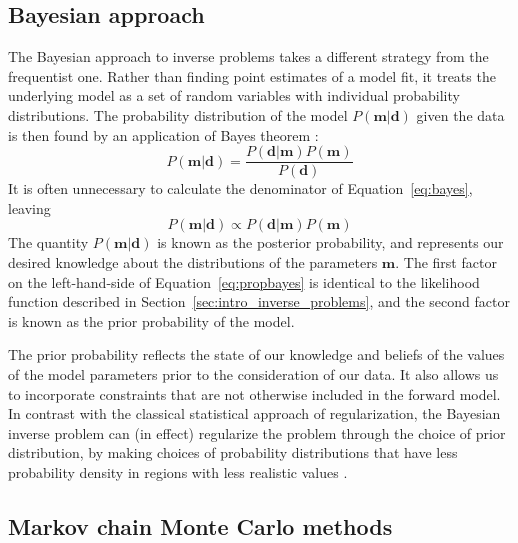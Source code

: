 \documentclass[preprint,12pt,authoryear]{elsarticle}
\begin{document}
\subsection{Bayesian approach}

The Bayesian approach to inverse problems takes a different strategy from the frequentist one.
Rather than finding point estimates of a model fit, it treats the underlying model
as a set of random variables with individual probability distributions.
The probability distribution of the model $P(\mathbf{m} \vert \mathbf{d})$ given the data 
is then found by an application of Bayes theorem \citep[cf.][]{sivia2006data}:
\begin{equation}
P\left(\mathbf{m} \vert \mathbf{d} \right) = \frac{ P \left(\mathbf{d}\vert \mathbf{m} \right) P \left( \mathbf{m} \right) }{P \left( \mathbf{d}\right)}
\label{eq:bayes}
\end{equation}
It is often unnecessary to calculate the denominator of Equation~\eqref{eq:bayes}, leaving
\begin{equation}
P\left(\mathbf{m} \vert \mathbf{d} \right) \propto P \left( \mathbf{d} \vert \mathbf{m} \right) P \left( \mathbf{m} \right) 
\label{eq:propbayes}
\end{equation}
The quantity $P(\mathbf{m} \vert \mathbf{d})$ is known as the posterior probability,
and represents our desired knowledge about the distributions of the parameters $\mathbf{m}$.
The first factor on the left-hand-side of Equation~\eqref{eq:propbayes} is identical to the likelihood
function described in Section~\ref{sec:intro_inverse_problems}, and the second factor
is known as the prior probability of the model.

The prior probability reflects the state of our knowledge and beliefs of the values
of the model parameters prior to the consideration of our data. It also allows us
to incorporate constraints that are not otherwise included in the forward model.
In contrast with the classical statistical approach of regularization, the Bayesian
inverse problem can (in effect) regularize the problem through the choice of prior distribution, by making
choices of probability distributions that have less probability density in
regions with less realistic values \citep{minson2013bayesian, sambridge2013transdimensional}.

\subsection{Markov chain Monte Carlo methods}
\end{document}
